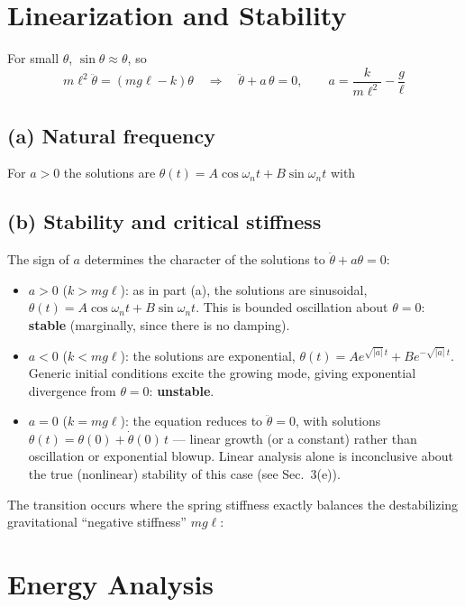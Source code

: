 \documentclass[11pt]{article}
\newcommand{\kcr}{k_{cr}}
\newcommand{\thd}{\dot\theta}
\newcommand{\thdd}{\ddot\theta}
\newcommand{\ans}[1]{\begin{center}\fbox{\rule[-1.2ex]{0pt}{3.6ex}\hspace{0.6em}$\displaystyle #1$\hspace{0.6em}}\end{center}}
\begin{document}
\section{Linearization and Stability}

For small $\theta$, $\sin\theta\approx\theta$, so
\[
  m\ell^2\thdd = (mg\ell - k)\theta
  \quad\Longrightarrow\quad
  \thdd + a\,\theta = 0,
  \qquad
  \boxed{a = \frac{k}{m\ell^2}-\frac{g}{\ell}}
\]

\subsection*{(a) Natural frequency}
For $a>0$ the solutions are $\theta(t)=A\cos\omega_n t + B\sin\omega_n t$ with
\ans{\omega_n = \sqrt{a} = \sqrt{\frac{k}{m\ell^2}-\frac{g}{\ell}}}

\subsection*{(b) Stability and critical stiffness}
The sign of $a$ determines the character of the solutions to $\thdd + a\theta = 0$:
\begin{itemize}
  \item $a>0$ ($k>mg\ell$): as in part (a), the solutions are sinusoidal, $\theta(t)=A\cos\omega_n t + B\sin\omega_n t$. This is bounded oscillation about $\theta=0$: \textbf{stable} (marginally, since there is no damping).
  \item $a<0$ ($k<mg\ell$): the solutions are exponential, $\theta(t) = Ae^{\sqrt{|a|}\,t} + Be^{-\sqrt{|a|}\,t}$. Generic initial conditions excite the growing mode, giving exponential divergence from $\theta=0$: \textbf{unstable}.
  \item $a=0$ ($k=mg\ell$): the equation reduces to $\thdd=0$, with solutions $\theta(t)=\theta(0)+\thd(0)\,t$ --- linear growth (or a constant) rather than oscillation or exponential blowup. Linear analysis alone is inconclusive about the true (nonlinear) stability of this case (see Sec.~3(e)).
\end{itemize}
The transition occurs where the spring stiffness exactly balances the destabilizing gravitational ``negative stiffness'' $mg\ell$:
\ans{\kcr = mg\ell}

\section{Energy Analysis}
\end{document}

